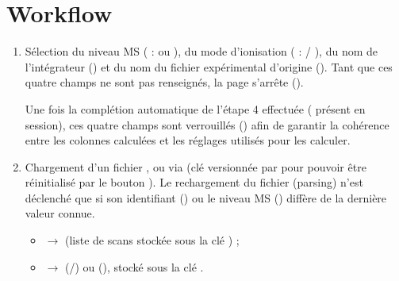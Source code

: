 \documentclass[letterpaper,10pt,english]{sphinxmanual}
\begin{document}
\section{Workflow}
\label{\detokenize{1_Integration:workflow}}\begin{enumerate}
%
\item {} 
\sphinxAtStartPar
{}
Sélection du niveau MS ( :  ou ), du mode
d’ionisation ( :  / ), du nom de
l’intégrateur () et du nom du fichier expérimental
d’origine (). Tant que ces quatre champs ne sont pas
renseignés, la page s’arrête ().

\sphinxAtStartPar
Une fois la complétion automatique de l’étape 4 effectuée (
présent en session), ces quatre champs sont verrouillés ()
afin de garantir la cohérence entre les colonnes calculées et les réglages
utilisés pour les calculer.

\item {} 
\sphinxAtStartPar
{}
Chargement d’un fichier ,  ou  via
 (clé versionnée par  pour pouvoir
être réinitialisé par le bouton ). Le rechargement du fichier (parsing) n’est
déclenché que si son identifiant  () ou le
niveau MS () diffère de la dernière valeur connue.
\begin{itemize}
\item {} 
\sphinxAtStartPar
{} \(\rightarrow\)  (liste de scans stockée
sous la clé ) ;

\item {} 
\sphinxAtStartPar
{} \(\rightarrow\)  (/) ou
 (), stocké sous la clé .


\end{itemize}
\end{enumerate}
\end{document}
